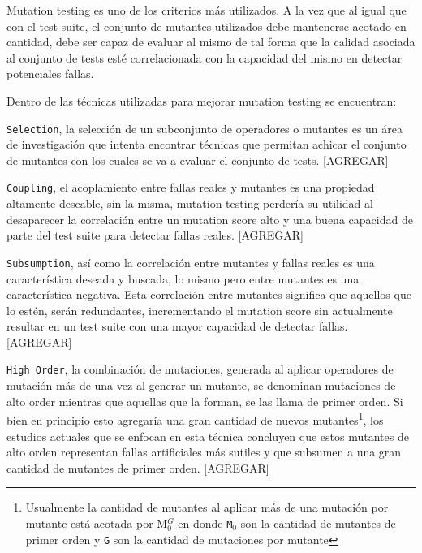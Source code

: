 Mutation testing es uno de los criterios m\'as utilizados. A la vez que al igual que con el test suite, el conjunto de mutantes utilizados debe mantenerse acotado en cantidad, debe ser capaz de evaluar al mismo de tal forma que la calidad asociada al conjunto de tests est\'e correlacionada con la capacidad del mismo en detectar potenciales fallas.

Dentro de las t\'ecnicas utilizadas para mejorar mutation testing se encuentran:

\texttt{Selection}, la selecci\'on de un subconjunto de operadores o mutantes es un \'area de investigaci\'on que intenta encontrar t\'ecnicas que permitan achicar el conjunto de mutantes con los cuales se va a evaluar el conjunto de tests. [AGREGAR]

\texttt{Coupling}, el acoplamiento entre fallas reales y mutantes es una propiedad altamente deseable, sin la misma, mutation testing perder\'ia su utilidad al desaparecer la correlaci\'on entre un mutation score alto y una buena capacidad de parte del test suite para detectar fallas reales. [AGREGAR]

\texttt{Subsumption}, as\'i como la correlaci\'on entre mutantes y fallas reales es una caracter\'istica deseada y buscada, lo mismo pero entre mutantes es una caracter\'istica negativa. Esta correlaci\'on entre mutantes significa que aquellos que lo est\'en, ser\'an redundantes, incrementando el mutation score sin actualmente resultar en un test suite con una mayor capacidad de detectar fallas. [AGREGAR]

\texttt{High Order}, la combinaci\'on de mutaciones, generada al aplicar operadores de mutaci\'on m\'as de una vez al generar un mutante, se denominan mutaciones de alto order mientras que aquellas que la forman, se las llama de primer orden. Si bien en principio esto agregar\'ia una gran cantidad de nuevos mutantes\footnote{Usualmente la cantidad de mutantes al aplicar m\'as de una mutaci\'on por mutante est\'a acotada por M$_0^G$ en donde \texttt{M$_0$} son la cantidad de mutantes de primer orden y \texttt{G} son la cantidad de mutaciones por mutante}, los estudios actuales que se enfocan en esta t\'ecnica concluyen que estos mutantes de alto orden representan fallas artificiales m\'as sutiles y que subsumen a una gran cantidad de mutantes de primer orden. [AGREGAR]

